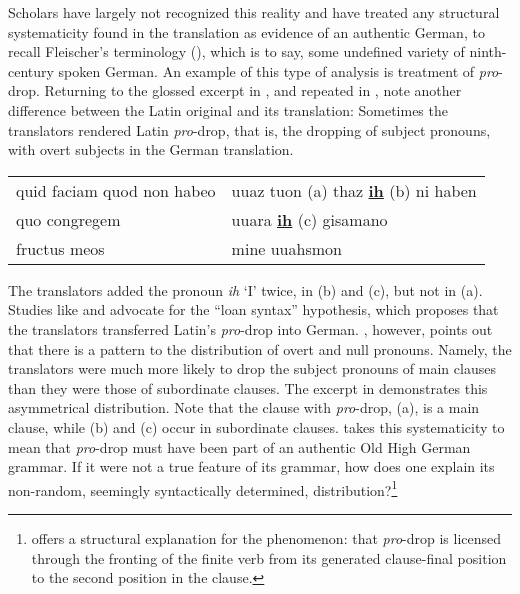 Scholars have largely not recognized this reality and have treated any structural systematicity found in the translation as evidence of an authentic German, to recall Fleischer’s terminology (), which is to say, some undefined variety of ninth-century spoken German. An example of this type of analysis is  treatment of \textit{pro}{}-drop. Returning to the glossed excerpt in , and repeated in , note another difference between the Latin original and its translation: Sometimes the translators rendered Latin \textit{pro}{}-drop, that is, the dropping of subject pronouns, with overt subjects in the German translation.

\ea%
\label{ex:3:3}\begin{tabular}[t]{@{}ll@{}}
quid faciam quod non habeo & uuaz tuon {\longrule} (a) thaz \ul{\textbf{ih}}  (b) ni haben   \\
quo congregem              & uuara \ul{\textbf{ih}} (c) gisamano                                \\
fructus meos               & mine uuahsmon                                                 \\
\end{tabular}
\z

\noindent The translators added the pronoun \textit{ih} ‘I’ twice, in (b) and (c), but not in (a). Studies like \citet{Eggenberger1961} and \citet{Hopper1975} advocate for the “loan syntax” hypothesis, which proposes that the translators transferred Latin’s \textit{pro}{}-drop into German. \citet[306--308]{Axel2007}, however, points out that there is a pattern to the distribution of overt and null pronouns. Namely, the translators were much more likely to drop the subject pronouns of main clauses than they were those of subordinate clauses. The excerpt in  demonstrates this asymmetrical distribution. Note that the clause with \textit{pro}{}-drop, (a), is a main clause, while (b) and (c) occur in subordinate clauses. \citet[303--306]{Axel2007} takes this systematicity to mean that \textit{pro}{}-drop must have been part of an authentic Old High German grammar. If it were not a true feature of its grammar, how does one explain its non-random, seemingly syntactically determined, distribution?\footnote{{\citet{Axel2007} offers a structural explanation for the phenomenon: that} \textrm{\textit{pro}}\textrm{{}-drop is licensed through the fronting of the finite verb from its generated clause-final position to the second position in the clause.}}

